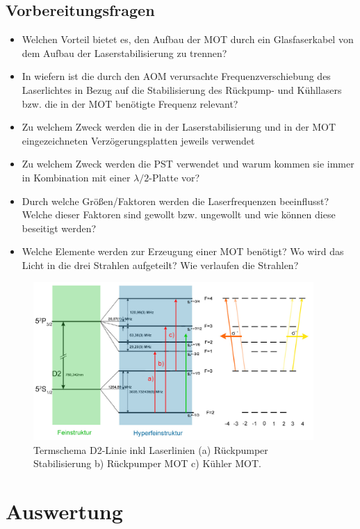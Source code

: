 \documentclass[10pt,a4paper]{extarticle}
\begin{document}
\subsection*{Vorbereitungsfragen}
\begin{itemize}
\item Welchen Vorteil bietet es, den Aufbau der MOT durch ein Glasfaserkabel von dem Aufbau der Laserstabilisierung zu trennen?
\item In wiefern ist die durch den AOM verursachte Frequenzverschiebung des Laserlichtes in Bezug auf die Stabilisierung des Rückpump- und Kühllasers bzw. die in der MOT benötigte Frequenz relevant?
\item Zu welchem Zweck werden die in der Laserstabilisierung und in der MOT eingezeichneten Verzögerungsplatten jeweils verwendet
\item Zu welchem Zweck werden die PST verwendet und warum kommen sie immer in Kombination mit einer $\lambda/2$-Platte vor?
\item Durch welche Größen/Faktoren werden die Laserfrequenzen beeinflusst? Welche dieser Faktoren sind gewollt bzw. ungewollt und wie können diese beseitigt werden?
\item Welche Elemente werden zur Erzeugung einer MOT benötigt? Wo wird das Licht in die drei Strahlen aufgeteilt? Wie verlaufen die Strahlen?
\end{itemize}

\begin{figure}[htb!]
	\centering
	\includegraphics[width = 0.95\textwidth]{TS_korrigiert.jpg}
	\caption{Termschema D2-Linie inkl Laserlinien (a) Rückpumper Stabilisierung b) Rückpumper MOT c) Kühler MOT.}
\end{figure}

\newpage
\section*{Auswertung}
\end{document}
